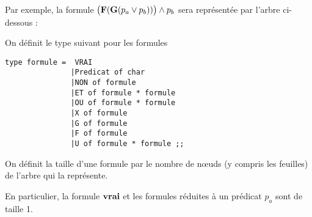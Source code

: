 Par exemple, la formule $\bigl({\bf F}({\bf G}(p_a\vee p_b))\bigr) \wedge p_b$ sera représentée par l'arbre ci-dessous :
\begin{center}
\end{center}

\newpage

On définit le type suivant pour les formules
\begin{lstlisting}
type formule =  VRAI
               |Predicat of char
               |NON of formule
               |ET of formule * formule
               |OU of formule * formule
               |X of formule
               |G of formule
               |F of formule
               |U of formule * formule ;;
\end{lstlisting}

On définit la taille d'une formule par le nombre de nœuds (y compris les feuilles) de l'arbre qui la représente.

En particulier, la formule ${\bf vrai}$ et les formules réduites à un prédicat $p_a$ sont de taille 1.


